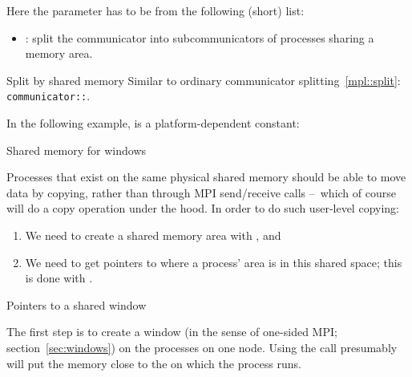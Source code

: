 Here the  parameter has to be from the following (short) list:
\begin{itemize}
\item {}: split the communicator into subcommunicators
  of processes sharing a memory area.
\end{itemize}

\begin{mplnote}{Split by shared memory}
  Similar to ordinary communicator splitting~\ref{mpl::split}:
  \lstinline+communicator::+.
\end{mplnote}

In the following example,  is a platform-dependent
constant:
%

 {Shared memory for windows}

Processes that exist on the same physical shared memory should be able
to move data by copying, rather than through MPI send/receive calls
--~which of course will do a copy operation under the hood.
In order to do such user-level copying:
\begin{enumerate}
\item We need to create a shared memory area with
  , and
\item We need to get pointers to where a process' area is in this
  shared space; this is done with .
\end{enumerate}

 {Pointers to a shared window}

The first step is to create a window (in the sense of one-sided MPI;
section~\ref{sec:windows}) on the processes on one node.
Using the  call presumably will
put the memory close to the 
 on which the process runs.

